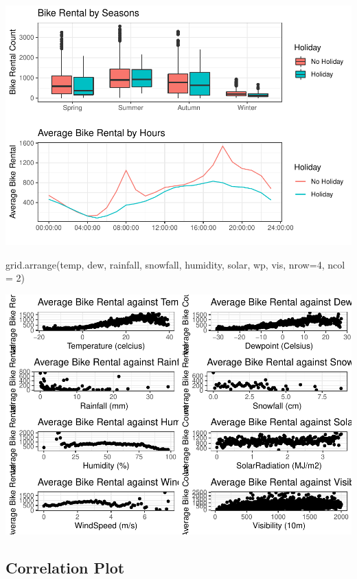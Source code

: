 \documentclass[
]{article}
\newenvironment{Shaded}{\begin{snugshade}}{\end{snugshade}}
\newcommand{\AttributeTok}[1]{\textcolor[rgb]{0.77,0.63,0.00}{#1}}
\newcommand{\DecValTok}[1]{\textcolor[rgb]{0.00,0.00,0.81}{#1}}
\newcommand{\FunctionTok}[1]{\textcolor[rgb]{0.00,0.00,0.00}{#1}}
\newcommand{\NormalTok}[1]{#1}
\begin{document}
\includegraphics{BikeProject_files/figure-latex/EDA-2.pdf}

\begin{Shaded}
\begin{Highlighting}[]
\FunctionTok{grid.arrange}\NormalTok{(temp, dew, rainfall, snowfall, humidity, solar, wp, vis, }\AttributeTok{nrow=}\DecValTok{4}\NormalTok{, }\AttributeTok{ncol =} \DecValTok{2}\NormalTok{)}
\end{Highlighting}
\end{Shaded}

\includegraphics{BikeProject_files/figure-latex/EDA-3.pdf}

\hypertarget{correlation-plot}{%
\subsection{Correlation Plot}\label{correlation-plot}}
\end{document}
